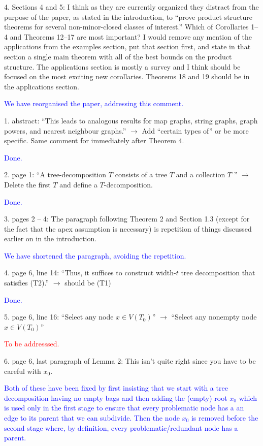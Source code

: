 \documentclass[12pt]{article}
\newcommand{\done}{\textcolor{blue}{Done.}}
\newcommand{\tba}{\textcolor{red}{To be addresssed.}}
\begin{document}
4. Sections 4 and 5: I think as they are currently organized they distract from the purpose of the paper, as stated in the introduction, to ``prove product structure theorems for several non-minor-closed classes of interest.'' Which of Corollaries 1--4 and Theorems 12--17 are most important? I would remove any mention of the applications from the examples section, put that section first, and state in that section a single main theorem with all of the best bounds on the product structure. The applications section is mostly a survey and I think should be focused on the most exciting new corollaries. Theorems 18 and 19 should be in the applications section.

\textcolor{blue}{We have reorganised the paper, addressing this comment. }

1. abstract: ``This leads to analogous results for map graphs, string graphs, graph powers, and nearest neighbour graphs.'' $\longrightarrow$
Add ``certain types of'' or be more specific. Same comment for immediately after Theorem 4.

\done

2. page 1: ``A tree-decomposition $T$ consists of a tree $T$ and a collection
$T$ '' $\longrightarrow$ Delete the first $T$ and define a $T$-decomposition.

\done

3. pages 2 – 4: The paragraph following Theorem 2 and Section 1.3
(except for the fact that the apex assumption is necessary) is repetition
of things discussed earlier on in the introduction.

\textcolor{blue}{We have shortened the paragraph, avoiding the repetition.}

4. page 6, line 14: ``Thus, it suffices to construct width-$t$ tree decomposition that satisfies (T2).'' $\longrightarrow$ should be (T1)

\done

5. page 6, line 16: ``Select any node $x \in V (T_0)$'' $\longrightarrow$ ``Select any nonempty node $x \in V (T_0)$''

\tba

6. page 6, last paragraph of Lemma 2: This isn’t quite right since you
have to be careful with $x_0$.

\textcolor{blue}{Both of these have been fixed by first insisting that we start with a tree decomposition having no empty bags and then adding the (empty) root $x_0$ which is used only in the first stage to ensure that every problematic node has a an edge to its parent that we can subdivide.   Then the node $x_0$ is removed before the second stage where, by definition, every problematic/redundant node has a parent.} 
\end{document}
